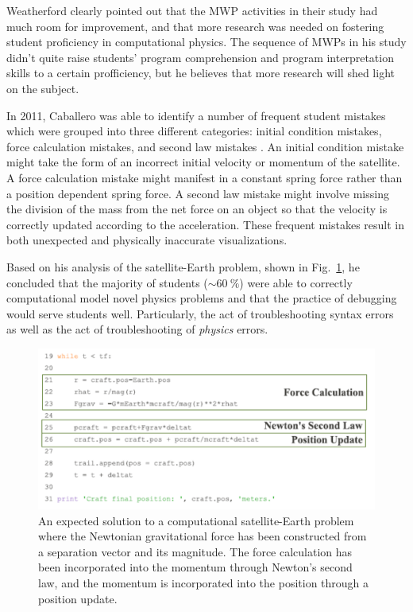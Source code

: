 \documentclass{msuphddissertation}
\begin{document}
\begin{doublespace}
Weatherford clearly pointed out that the MWP activities in their study had much room for improvement, and that more research was needed on fostering student proficiency in computational physics.  The sequence of MWPs in his study didn't quite raise 
students' program comprehension and program interpretation skills to a certain profficiency, but he believes that more research will shed light on the subject.

In 2011, Caballero was able to identify a number of frequent student mistakes which were grouped into three different categories: initial condition mistakes, force calculation mistakes, and second law mistakes \cite{Caballero2011}.  An initial condition mistake might take the form of an incorrect initial velocity or momentum of the satellite.  A force calculation mistake might manifest in a constant spring force rather than a position dependent spring force.  A second law mistake might involve missing the division of the mass from the net force on an object so that the velocity is correctly updated according to the acceleration.  These frequent mistakes result in both unexpected and physically inaccurate visualizations.

Based on his analysis of the satellite-Earth problem, shown in Fig.~\ref{CH2:Caballero}, he concluded that the majority of students ($\sim\SI{60}{\percent}$) were able to correctly computational model novel physics problems and that the practice of debugging would serve students well.  Particularly, the act of troubleshooting syntax errors as well as the act of troubleshooting of \textit{physics} errors.

\begin{figure}\center
\includegraphics[scale=0.8]{images/CH2Caballero.pdf}
\caption{An expected solution to a computational satellite-Earth problem where the Newtonian gravitational force has been constructed from a separation vector and its magnitude.  The force calculation has been incorporated into the momentum through Newton's second law, and the momentum is incorporated into the position through a position update.}\label{CH2:Caballero}
\end{figure}


\end{doublespace}
\end{document}
